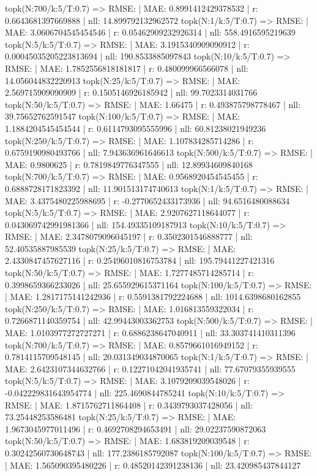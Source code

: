 topk(N:700/k:5/T:0.7) => RMSE: | MAE: 0.8991412429378532 | r: 0.6643681397669888 | nll: 14.899792132962572
topk(N:1/k:5/T:0.7) => RMSE: | MAE: 3.0606704545454546 | r: 0.05462909232926314 | nll: 558.4916595219639
topk(N:5/k:5/T:0.7) => RMSE: | MAE: 3.1915340909090912 | r: 0.00045035205223813694 | nll: 190.8533885097843
topk(N:10/k:5/T:0.7) => RMSE: | MAE: 1.7852556818181817 | r: 0.480099966566078 | nll: 14.056044832220913
topk(N:25/k:5/T:0.7) => RMSE: | MAE: 2.569715909090909 | r: 0.1505146926185942 | nll: 99.7023314031766
topk(N:50/k:5/T:0.7) => RMSE: | MAE: 1.66475 | r: 0.493875798778467 | nll: 39.75652762591547
topk(N:100/k:5/T:0.7) => RMSE: | MAE: 1.1884204545454544 | r: 0.6114793095555996 | nll: 60.81238021949236
topk(N:250/k:5/T:0.7) => RMSE: | MAE: 1.107834285714286 | r: 0.6759190980493766 | nll: 7.943636961646613
topk(N:500/k:5/T:0.7) => RMSE: | MAE: 0.9800625 | r: 0.7819849776347555 | nll: 12.89934609840168
topk(N:700/k:5/T:0.7) => RMSE: | MAE: 0.9568920454545455 | r: 0.6888728171823392 | nll: 11.901513174740613
topk(N:1/k:5/T:0.7) => RMSE: | MAE: 3.4375480225988695 | r: -0.2770652433173936 | nll: 94.6516480088634
topk(N:5/k:5/T:0.7) => RMSE: | MAE: 2.9207627118644077 | r: 0.043069742991981366 | nll: 154.49335109187913
topk(N:10/k:5/T:0.7) => RMSE: | MAE: 2.3478079096045197 | r: 0.3502301546888777 | nll: 52.40535887985539
topk(N:25/k:5/T:0.7) => RMSE: | MAE: 2.4330847457627116 | r: 0.25496010816753784 | nll: 195.79441227421316
topk(N:50/k:5/T:0.7) => RMSE: | MAE: 1.7277485714285714 | r: 0.3998659366233026 | nll: 25.655929615371164
topk(N:100/k:5/T:0.7) => RMSE: | MAE: 1.2817175141242936 | r: 0.5591381792224688 | nll: 1014.6398680162855
topk(N:250/k:5/T:0.7) => RMSE: | MAE: 1.016813559322034 | r: 0.7266871140359754 | nll: 42.99443003362753
topk(N:500/k:5/T:0.7) => RMSE: | MAE: 1.0103977272727271 | r: 0.6886238647040911 | nll: 33.303741410311396
topk(N:700/k:5/T:0.7) => RMSE: | MAE: 0.8579661016949152 | r: 0.7814115709548145 | nll: 20.031349034870065
topk(N:1/k:5/T:0.7) => RMSE: | MAE: 2.6423107344632766 | r: 0.12271042041935741 | nll: 77.67079355939555
topk(N:5/k:5/T:0.7) => RMSE: | MAE: 3.1079209039548026 | r: -0.042229831643954774 | nll: 225.4690844785241
topk(N:10/k:5/T:0.7) => RMSE: | MAE: 1.8715762711864408 | r: 0.3439793037428056 | nll: 73.25448253586481
topk(N:25/k:5/T:0.7) => RMSE: | MAE: 1.9673045977011496 | r: 0.4692708294653491 | nll: 29.02237590872063
topk(N:50/k:5/T:0.7) => RMSE: | MAE: 1.683819209039548 | r: 0.30242560730648743 | nll: 177.2386185792087
topk(N:100/k:5/T:0.7) => RMSE: | MAE: 1.565090395480226 | r: 0.48520142391238136 | nll: 23.420985437844127
